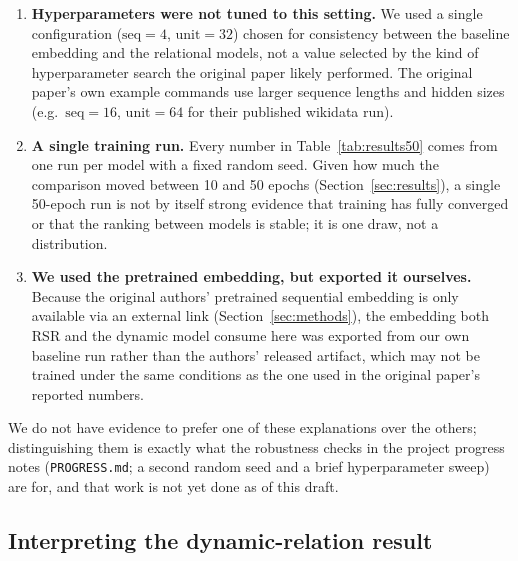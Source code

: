 \documentclass[12pt]{article}
\begin{document}
\begin{enumerate}
  \item \textbf{Hyperparameters were not tuned to this setting.} We used a single configuration
  ($\text{seq}=4$, $\text{unit}=32$) chosen for consistency between the baseline embedding and the
  relational models, not a value selected by the kind of hyperparameter search the original paper
  likely performed. The original paper's own example commands use larger sequence lengths and
  hidden sizes (e.g.\ $\text{seq}=16$, $\text{unit}=64$ for their published wikidata run).
  \item \textbf{A single training run.} Every number in Table~\ref{tab:results50} comes from one
  run per model with a fixed random seed. Given how much the comparison moved between 10 and 50
  epochs (Section~\ref{sec:results}), a single 50-epoch run is not by itself strong evidence that
  training has fully converged or that the ranking between models is stable; it is one draw, not a
  distribution.
  \item \textbf{We used the pretrained embedding, but exported it ourselves.} Because the
  original authors' pretrained sequential embedding is only available via an external link
  (Section~\ref{sec:methods}), the embedding both RSR and the dynamic model consume here was
  exported from our own baseline run rather than the authors' released artifact, which may not be
  trained under the same conditions as the one used in the original paper's reported numbers.
\end{enumerate}

We do not have evidence to prefer one of these explanations over the others; distinguishing them
is exactly what the robustness checks in the project progress notes (\texttt{PROGRESS.md}; a
second random seed and a brief hyperparameter sweep) are for, and that work is not yet done as of
this draft.

\subsection{Interpreting the dynamic-relation result}
\label{sec:discussion}
\end{document}
